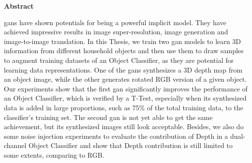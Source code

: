 \thispagestyle{empty}
\vspace*{1.0cm}

\begin{center}
    \textbf{Abstract}
\end{center}

\vspace*{0.5cm}

\noindent

\acrfull{gan}s have shown potentials for being a powerful implicit model. They have
achieved impressive results in image super-resolution, image generation and image-to-image
translation. In this Thesis, we train two \acrfull{gan} models to learn 3D information
from different household objects and then use them to draw samples to augment training
datasets of an Object Classifier, as they are potential for learning data representations.
One of the \acrshort{gan}s synthesizes a 3D depth map from an object image, while the
other generates rotated RGB version of a given object. Our experiments show that the first
\acrshort{gan} significantly improves the performance of an Object Classifier, which is
verified by a T-Test, especially when its synthesized data is added in large proportions,
such as 75\% of the total training data, to the classifier's training set. The second
\acrshort{gan} is not yet able to get the same achievement, but its synthesized images
still look acceptable. Besides, we also do some noise injection experiments to evaluate
the contribution of Depth in a dual-channel Object Classifier and show that Depth
contribution is still limited to some extents, comparing to RGB.
\\
